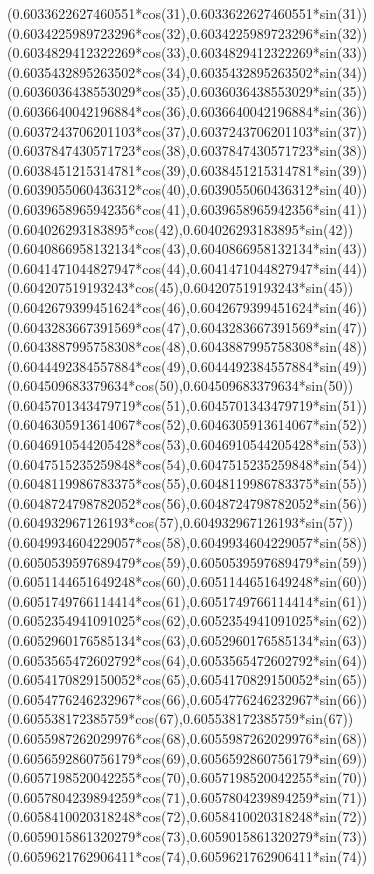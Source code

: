 {({0.6033622627460551*cos(31)},{0.6033622627460551*sin(31)})
({0.6034225989723296*cos(32)},{0.6034225989723296*sin(32)})
({0.6034829412322269*cos(33)},{0.6034829412322269*sin(33)})
({0.6035432895263502*cos(34)},{0.6035432895263502*sin(34)})
({0.6036036438553029*cos(35)},{0.6036036438553029*sin(35)})
({0.6036640042196884*cos(36)},{0.6036640042196884*sin(36)})
({0.6037243706201103*cos(37)},{0.6037243706201103*sin(37)})
({0.6037847430571723*cos(38)},{0.6037847430571723*sin(38)})
({0.6038451215314781*cos(39)},{0.6038451215314781*sin(39)})
({0.6039055060436312*cos(40)},{0.6039055060436312*sin(40)})
({0.6039658965942356*cos(41)},{0.6039658965942356*sin(41)})
({0.604026293183895*cos(42)},{0.604026293183895*sin(42)})
({0.6040866958132134*cos(43)},{0.6040866958132134*sin(43)})
({0.6041471044827947*cos(44)},{0.6041471044827947*sin(44)})
({0.604207519193243*cos(45)},{0.604207519193243*sin(45)})
({0.6042679399451624*cos(46)},{0.6042679399451624*sin(46)})
({0.6043283667391569*cos(47)},{0.6043283667391569*sin(47)})
({0.6043887995758308*cos(48)},{0.6043887995758308*sin(48)})
({0.6044492384557884*cos(49)},{0.6044492384557884*sin(49)})
({0.604509683379634*cos(50)},{0.604509683379634*sin(50)})
({0.6045701343479719*cos(51)},{0.6045701343479719*sin(51)})
({0.6046305913614067*cos(52)},{0.6046305913614067*sin(52)})
({0.6046910544205428*cos(53)},{0.6046910544205428*sin(53)})
({0.6047515235259848*cos(54)},{0.6047515235259848*sin(54)})
({0.6048119986783375*cos(55)},{0.6048119986783375*sin(55)})
({0.6048724798782052*cos(56)},{0.6048724798782052*sin(56)})
({0.604932967126193*cos(57)},{0.604932967126193*sin(57)})
({0.6049934604229057*cos(58)},{0.6049934604229057*sin(58)})
({0.6050539597689479*cos(59)},{0.6050539597689479*sin(59)})
({0.6051144651649248*cos(60)},{0.6051144651649248*sin(60)})
({0.6051749766114414*cos(61)},{0.6051749766114414*sin(61)})
({0.6052354941091025*cos(62)},{0.6052354941091025*sin(62)})
({0.6052960176585134*cos(63)},{0.6052960176585134*sin(63)})
({0.6053565472602792*cos(64)},{0.6053565472602792*sin(64)})
({0.6054170829150052*cos(65)},{0.6054170829150052*sin(65)})
({0.6054776246232967*cos(66)},{0.6054776246232967*sin(66)})
({0.605538172385759*cos(67)},{0.605538172385759*sin(67)})
({0.6055987262029976*cos(68)},{0.6055987262029976*sin(68)})
({0.6056592860756179*cos(69)},{0.6056592860756179*sin(69)})
({0.6057198520042255*cos(70)},{0.6057198520042255*sin(70)})
({0.6057804239894259*cos(71)},{0.6057804239894259*sin(71)})
({0.6058410020318248*cos(72)},{0.6058410020318248*sin(72)})
({0.6059015861320279*cos(73)},{0.6059015861320279*sin(73)})
({0.6059621762906411*cos(74)},{0.6059621762906411*sin(74)})
}
